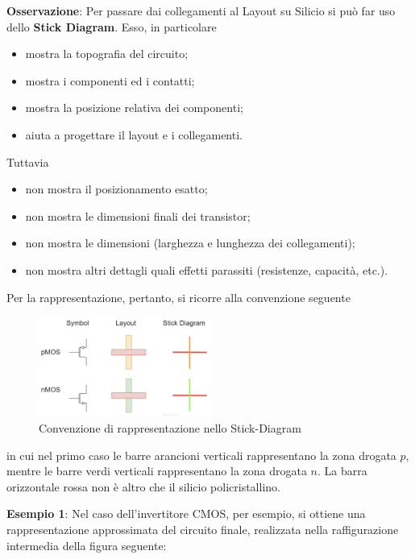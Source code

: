 \documentclass[a4paper]{extarticle}
\begin{document}
\vspace{1em}
\noindent
\textbf{Osservazione}: Per passare dai collegamenti al Layout su Silicio si può far uso dello \textbf{Stick Diagram}. Esso, in particolare
\begin{itemize}
    \item mostra la topografia del circuito;
    \item mostra i componenti ed i contatti;
    \item mostra la posizione relativa dei componenti;
    \item aiuta a progettare il layout e i collegamenti.
\end{itemize}
Tuttavia
\begin{itemize}
    \item non mostra il posizionamento esatto;
    \item non mostra le dimensioni finali dei transistor;
    \item non mostra le dimensioni (larghezza e lunghezza dei collegamenti);
    \item non mostra altri dettagli quali effetti parassiti (resistenze, capacità, etc.).
\end{itemize}
Per la rappresentazione, pertanto, si ricorre alla convenzione seguente

\begin{figure}[H]
    \centering
    \includegraphics[width=0.5\textwidth]{convenzione-stick-diagram.png}
    \caption{Convenzione di rappresentazione nello Stick-Diagram}
    \label{fig:convensione_stick_diagram}
\end{figure}

\noindent
in cui nel primo caso le barre arancioni verticali rappresentano la zona drogata $p$, mentre le barre verdi verticali rappresentano la zona drogata $n$. La barra orizzontale rossa non è altro che il silicio policristallino.

\newpage
\noindent
\textbf{Esempio 1}: Nel caso dell'invertitore CMOS, per esempio, si ottiene una rappresentazione approssimata del circuito finale, realizzata nella raffigurazione intermedia della figura seguente:
\end{document}
